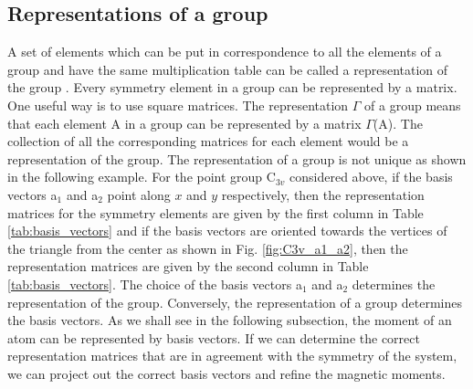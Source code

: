 \documentclass[letterpaper,10pt,doublespacing,edeposit]{uiucthesis2020}
\begin{document}
\begin{mainmatter}
\subsection{Representations of a group}

A set of elements which can be put in correspondence to all the elements of a group and have the same multiplication table can be called a representation of the group \cite{Koster1956}. Every symmetry element in a group can be represented by a matrix. One useful way is to use square matrices. The representation $\Gamma$ of a group means that each element A in a group can be represented by a matrix $\Gamma$(A). The collection of all the corresponding matrices for each element would be a representation of the group. The representation of a group is not unique as shown in the following example. For the point group C$_{3v}$ considered above, if the basis vectors a$_1$ and a$_2$ point along $x$ and $y$ respectively, then the representation matrices for the symmetry elements are given by the first column in Table \ref{tab:basis_vectors} and if the basis vectors are oriented towards the vertices of the triangle from the center as shown in Fig. \ref{fig:C3v_a1_a2}, then the representation matrices are given by the second column in Table \ref{tab:basis_vectors}. The choice of the basis vectors a$_1$ and a$_2$ determines the representation of the group. Conversely, the representation of a group determines the basis vectors. As we shall see in the following subsection, the moment of an atom can be represented by basis vectors. If we can determine the correct representation matrices that are in agreement with the symmetry of the system, we can project out the correct basis vectors and refine the magnetic moments.


\end{mainmatter}
\end{document}

